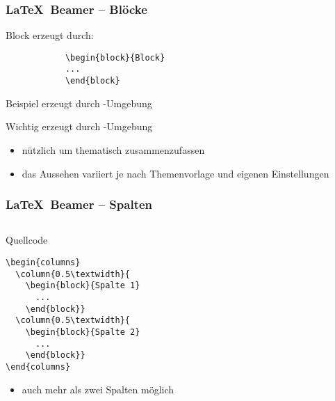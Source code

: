 \begin{frame}[fragile]
	\frametitle{\LaTeX\ Beamer -- Blöcke}
	\begin{block}{Block}
		erzeugt durch:
		\begin{lstlisting}
			\begin{block}{Block}
			...
			\end{block}
		\end{lstlisting}
	\end{block}
	\begin{exampleblock}{Beispiel}
		erzeugt durch -Umgebung
	\end{exampleblock}
	\begin{alertblock}{Wichtig}
		erzeugt durch -Umgebung
	\end{alertblock}
	\vfill
	\begin{itemize}
		\item nützlich um thematisch zusammenzufassen
		\item das Aussehen variiert je nach Themenvorlage und eigenen Einstellungen
	\end{itemize}
\end{frame}

\begin{frame}[fragile]
	\frametitle{\LaTeX\ Beamer -- Spalten}
	\vspace{-1cm}
	\begin{columns}
	\end{columns}
	\vfill
	\begin{block}{Quellcode}
		\begin{lstlisting}
\begin{columns}
  \column{0.5\textwidth}{
    \begin{block}{Spalte 1}
      ...
    \end{block}}
  \column{0.5\textwidth}{
    \begin{block}{Spalte 2}
      ...
    \end{block}}
\end{columns}
		\end{lstlisting}
	\end{block}
	\begin{itemize}
		\item auch mehr als zwei Spalten möglich
	\end{itemize}
\end{frame}


